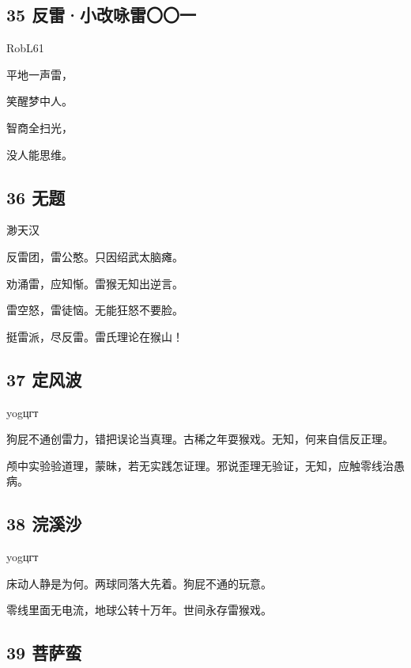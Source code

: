 \hypertarget{ux53cdux96f7ux5c0fux6539ux548fux96f7ux3007ux3007ux4e00}{%
\subsection{35
反雷·小改咏雷〇〇一}\label{ux53cdux96f7ux5c0fux6539ux548fux96f7ux3007ux3007ux4e00}}

RobL61

平地一声雷，

笑醒梦中人。

智商全扫光，

没人能思维。

\hypertarget{ux65e0ux9898-9}{%
\subsection{36 无题}\label{ux65e0ux9898-9}}

渺天汉

反雷团，雷公憨。只因绍武太脑瘫。

劝涌雷，应知惭。雷猴无知出逆言。

雷空怒，雷徒恼。无能狂怒不要脸。

挺雷派，尽反雷。雷氏理论在猴山！

\hypertarget{ux5b9aux98ceux6ce2}{%
\subsection{37 定风波}\label{ux5b9aux98ceux6ce2}}

yogцгт

狗屁不通创雷力，错把误论当真理。古稀之年耍猴戏。无知，何来自信反正理。

颅中实验验道理，蒙昧，若无实践怎证理。邪说歪理无验证，无知，应触零线治愚病。
~\\

\hypertarget{ux6d63ux6eaaux6c99}{%
\subsection{38 浣溪沙}\label{ux6d63ux6eaaux6c99}}

yogцгт

床动人静是为何。两球同落大先着。狗屁不通的玩意。

零线里面无电流，地球公转十万年。世间永存雷猴戏。 ~\\

\hypertarget{ux83e9ux8428ux86ee}{%
\subsection{39 菩萨蛮}\label{ux83e9ux8428ux86ee}}

